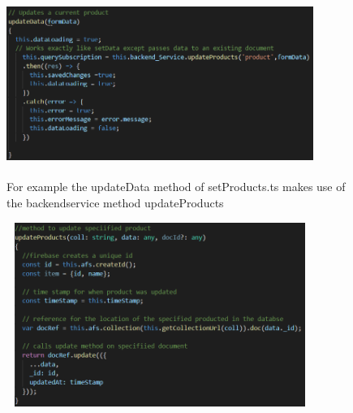 \begin{figure}[h!]
    	\caption{For example the updateData method of setProducts.ts makes use of the backendservice method updateProducts}
	\centering
	\includegraphics[width=10cm, height=6cm]{images/update.png}
\end{figure}
\begin{figure}[h!]
	\centering
	\includegraphics[width=10cm, height=6cm]{images/backendupdate.png}
\end{figure}

\newpage


